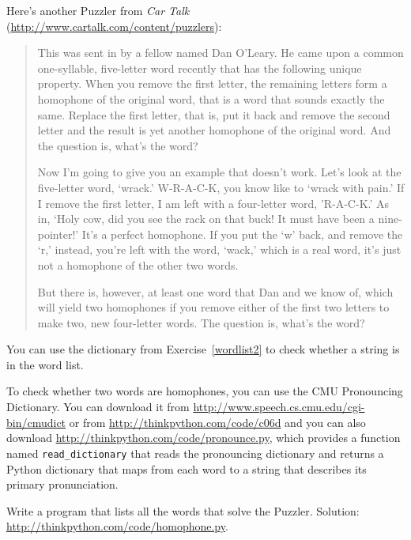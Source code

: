 \documentclass[10pt]{book}
\begin{document}
\begin{exercise}

Here's another Puzzler from {\em Car
Talk} (\url{http://www.cartalk.com/content/puzzlers}):

\begin{quote}
This was sent in by a fellow named Dan O'Leary. He came upon a common
one-syllable, five-letter word recently that has the following unique
property. When you remove the first letter, the remaining letters form
a homophone of the original word, that is a word that sounds exactly
the same. Replace the first letter, that is, put it back and remove
the second letter and the result is yet another homophone of the
original word. And the question is, what's the word?

Now I'm going to give you an example that doesn't work. Let's look at
the five-letter word, `wrack.' W-R-A-C-K, you know like to `wrack with
pain.' If I remove the first letter, I am left with a four-letter
word, 'R-A-C-K.' As in, `Holy cow, did you see the rack on that buck!
It must have been a nine-pointer!' It's a perfect homophone. If you
put the `w' back, and remove the `r,' instead, you're left with the
word, `wack,' which is a real word, it's just not a homophone of the
other two words.

But there is, however, at least one word that Dan and we know of,
which will yield two homophones if you remove either of the first two
letters to make two, new four-letter words. The question is, what's
the word?
\end{quote}

You can use the dictionary from Exercise~\ref{wordlist2} to check
whether a string is in the word list.

To check whether two words are homophones, you can use the CMU
Pronouncing Dictionary.  You can download it from
\url{http://www.speech.cs.cmu.edu/cgi-bin/cmudict} or from
\url{http://thinkpython.com/code/c06d} and you can also download
\url{http://thinkpython.com/code/pronounce.py}, which provides a function
named \verb"read_dictionary" that reads the pronouncing dictionary and
returns a Python dictionary that maps from each word to a string that
describes its primary pronunciation.

Write a program that lists all the words that solve the Puzzler.
Solution: \url{http://thinkpython.com/code/homophone.py}.

\end{exercise}
\end{document}
